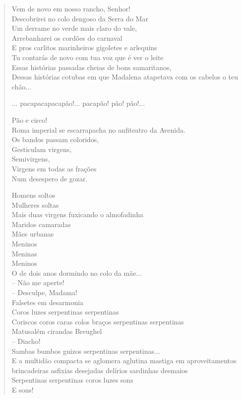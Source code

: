 \begin{verse}
Vem de novo em nosso rancho, Senhor!\\
Descobrirei no colo dengoso da Serra do Mar\\
Um derrame no verde mais claro do vale,\\
Arrebanharei os cordões do carnaval\\
E pros carlitos marinheiros gigoletes e arlequins\\
Tu contarás de novo com tua voz que é ver o leite\\
Essas histórias passadas cheias de bons samaritanos,\\
Dessas histórias cotubas em que Madalena atapetava com os cabelos o teu chão...

... pacapacapacapão!... pacapão! pão! pão!...

Pão e circo!\\
Roma imperial se escarrapacha no anfiteatro da Avenida.\\
Os bandos passam coloridos,\\
Gesticulam virgens,\\
Semivirgens,\\
Virgens em todas as frações\\
Num desespero de gozar.

Homens soltos\\
Mulheres soltas\\
Mais duas virgens fuxicando o almofadinha\\
Maridos camaradas\\
Mães urbanas\\
Meninos\\
Meninas\\
Meninos\\
O de dois anos dormindo no colo da mãe...\\
-- Não me aperte!\\
\quad{}-- Desculpe, Madama!\\
Falsetes em desarmonia\\
Coros luzes serpentinas serpentinas\\
Coriscos coros caras colos braços serpentinas serpentinas\\
Matusalém cirandas Breughel\\
\quad\quad\quad-- Diacho!\\
Sambas bumbos guizos serpentinas serpentinas...\\
E a multidão compacta se aglomera aglutina mastiga em aproveitamentos
brincadeiras asfixias desejadas delírios sardinhas desmaios\\
Serpentinas serpentinas coros luzes sons\\
E sons!\\


\end{verse}
